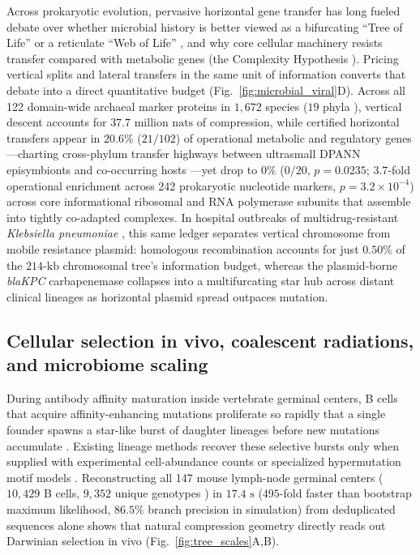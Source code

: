 \documentclass[11pt,a4paper]{article}
\begin{document}
Across prokaryotic evolution, pervasive horizontal gene transfer has long fueled debate over whether microbial history is better viewed as a bifurcating ``Tree of Life'' or a reticulate ``Web of Life'' \citep{doolittle1999phylogenetic,parks2018gtdb}, and why core cellular machinery resists transfer compared with metabolic genes (the Complexity Hypothesis \citep{jain1999horizontal,woese2000aminoacyl}). Pricing vertical splits and lateral transfers in the same unit of information converts that debate into a direct quantitative budget (Fig.~\ref{fig:microbial_viral}D). Across all 122 domain-wide archaeal marker proteins in $1,672$ species ($19$ phyla \citep{parks2020gtdb}), vertical descent accounts for $37.7\text{ million nats}$ of compression, while certified horizontal transfers appear in $20.6\%$ ($21/102$) of operational metabolic and regulatory genes---charting cross-phylum transfer highways between ultrasmall DPANN episymbionts and co-occurring hosts \citep{castelle2018major}---yet drop to $0\%$ ($0/20$, $p = 0.0235$; $3.7$-fold operational enrichment across 242 prokaryotic nucleotide markers, $p = 3.2 \times 10^{-4}$) across core informational ribosomal and RNA polymerase subunits that assemble into tightly co-adapted complexes. In hospital outbreaks of multidrug-resistant \textit{Klebsiella pneumoniae} \citep{wyres2020population}, this same ledger separates vertical chromosome from mobile resistance plasmid: homologous recombination accounts for just $0.50\%$ of the $214\text{-kb}$ chromosomal tree's information budget, whereas the plasmid-borne \textit{blaKPC} carbapenemase collapses into a multifurcating star hub across distant clinical lineages as horizontal plasmid spread outpaces mutation.

\subsection*{Cellular selection in vivo, coalescent radiations, and microbiome scaling}

During antibody affinity maturation inside vertebrate germinal centers, B cells that acquire affinity-enhancing mutations proliferate so rapidly that a single founder spawns a star-like burst of daughter lineages before new mutations accumulate \citep{tas2016visualizing}. Existing lineage methods recover these selective bursts only when supplied with experimental cell-abundance counts or specialized hypermutation motif models \citep{dewitt2018gctree}. Reconstructing all 147 mouse lymph-node germinal centers ($10,429$ B cells, $9,352$ unique genotypes \citep{dewitt2026gcreplay}) in $17.4\text{ s}$ ($495$-fold faster than bootstrap maximum likelihood, $86.5\%$ branch precision in simulation) from deduplicated sequences alone shows that natural compression geometry directly reads out Darwinian selection in vivo (Fig.~\ref{fig:tree_scales}A,B).
\end{document}
